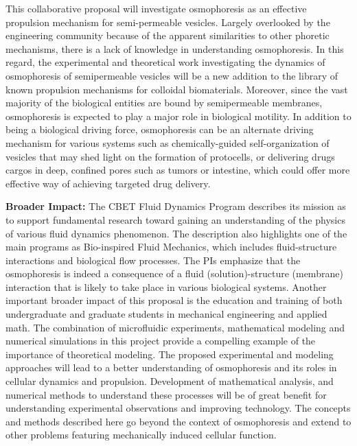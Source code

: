 \documentclass[11pt]{article}
\begin{document}
This collaborative proposal will investigate osmophoresis as an
effective propulsion mechanism for semi-permeable vesicles.  Largely
overlooked by the engineering community because of the apparent
similarities to other phoretic mechanisms, there is a lack of knowledge
in understanding osmophoresis.  In this regard, the experimental and
theoretical work investigating the dynamics of osmophoresis of
semipermeable vesicles will be a new addition to the library of known
propulsion mechanisms for colloidal biomaterials.  Moreover, since the
vast majority of the biological entities are bound by semipermeable
membranes, osmophoresis is expected to play a major role in biological
motility.  In addition to being a biological driving force, osmophoresis
can be an alternate driving mechanism for various systems such as
chemically-guided self-organization of vesicles that may shed light on
the formation of protocells, or delivering drugs cargos in deep,
confined pores such as tumors or intestine, which could offer more
effective way of achieving targeted drug delivery.

\noindent
{\bf Broader Impact:} 
The CBET Fluid Dynamics Program describes its mission as to support
fundamental research toward gaining an understanding of the physics of
various fluid dynamics phenomenon. The description also highlights one
of the main programs as Bio-inspired Fluid Mechanics, which includes
fluid-structure interactions and biological flow processes. The PIs
emphasize that the osmophoresis is indeed a consequence of a fluid
(solution)-structure (membrane) interaction that is likely to take place
in various biological systems.  Another important broader impact of this
proposal is the education and training of both undergraduate and
graduate students in mechanical engineering and applied math.  The
combination of microfluidic experiments, mathematical modeling and
numerical simulations in this project provide a compelling example of
the importance of theoretical modeling. The proposed experimental and
modeling approaches will lead to a better understanding of osmophoresis
and its roles in cellular dynamics and propulsion.  Development of
mathematical analysis, and numerical methods to understand these
processes will be of great benefit for understanding experimental
observations and improving technology.  The concepts and methods
described here go beyond the context of osmophoresis and extend to other
problems featuring mechanically induced cellular function.

\end{document}
